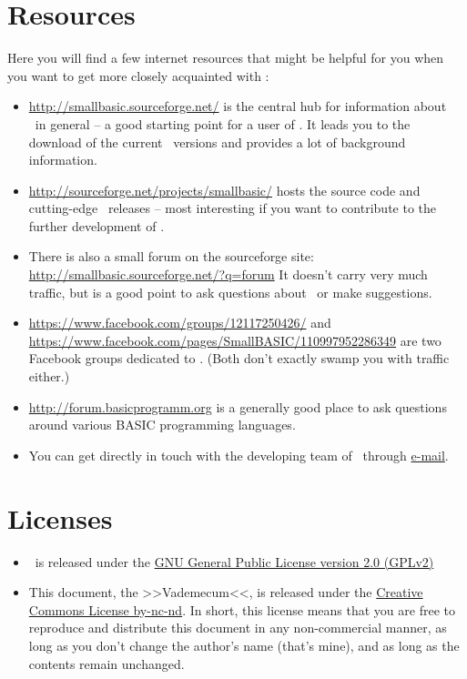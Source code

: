 \section{Resources \label{resources}}

Here you will find a few internet resources that might be helpful for you when
you want to get more closely acquainted with \SB:

\begin{itemize}

\item \url{http://smallbasic.sourceforge.net/} is the central hub for
information about \SB\ in general -- a good starting point for a user of
\SB. It leads you to the download of the current \SB\ versions and
provides a lot of background information.

\item \url{http://sourceforge.net/projects/smallbasic/} hosts the
source code and cutting-edge \SB\ releases -- most interesting if you want
to contribute to the further development of \SB.

\item There is also a small forum on the sourceforge site:
\url{http://smallbasic.sourceforge.net/?q=forum} It doesn't carry very
much traffic, but is a good point to ask questions about \SB\ or make
suggestions.

\item \url{https://www.facebook.com/groups/12117250426/} and
\url{https://www.facebook.com/pages/SmallBASIC/110997952286349} are two
Facebook groups dedicated to \SB. (Both don't exactly swamp you with
traffic either.)

\item \url{http://forum.basicprogramm.org} is a generally good place to
ask questions around various BASIC programming languages.

\item You can get directly in touch with the developing team of \SB\
through \href{mailto:smallbasic@gmail.com}{e-mail}.

\end{itemize}

\section{Licenses}

\begin{itemize}

\item{\SB\ is released under the
\href{http://www.gnu.org/licenses/old-licenses/gpl-2.0}{GNU General Public
License version 2.0 (GPLv2)}}

\item{This document, the >>Vademecum<<, is released under the
\href{http://creativecommons.org/licenses/by-nc-nd/3.0/de/deed.en_GB}{Creative
Commons License by-nc-nd}. In short, this license means that you are
free to reproduce and distribute this document in any non-commercial
manner, as long as you don't change the author's name (that's mine), and
as long as the contents remain unchanged.}

\end{itemize}

